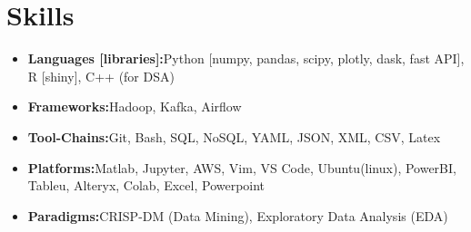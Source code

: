 \documentclass[a4paper,11pt]{article}
\newcommand{\resumeItem}[2]{
  \item{
    \textbf{#1}{\hspace{0.5mm}#2 \vspace{-0.5mm}}
  }
}
\newcommand{\resumeSubItem}[2]{\resumeItem{#1}{#2}\vspace{-4pt}}
\newcommand{\resumeHeadingSkillStart}{\begin{itemize}[leftmargin=*,itemsep=1mm, rightmargin=2ex]}
\newcommand{\resumeHeadingSkillEnd}{\end{itemize}\vspace{-2mm}}
\begin{document}
\begin{comment} %
\section{\textbf{Patents and Publications} \hfill \textcolor{darkblue}{\scriptsize C=Conference, J=Journal, P=Patent, S=In Submission, T=Thesis}}
\vspace{0.2mm}
\small{
\begin{enumerate}[leftmargin=*, labelsep=0.5em, align=left, widest={[\textbf{S.1}]}, itemindent=0em, label={\textbf{[\arabic*]}]}]
\item[\textbf{[C.1]}] Your Name, et al. (Year). \href{https://doi.org/XX.XXXX/XXXXXXX.XXXX.XXXXXXX}{\textbf{Title of Conference Paper}}. In \textit{Name of Conference Proceedings}, pp. XX-XX. Publisher. Date, Location. DOI: XX.XXXX/XXXXXXX.XXXX.XXXXXXX

\item[\textbf{[S.1]}] Your Name, et al. (Year). \textbf{Title of Submitted Paper}. Manuscript submitted for publication in \textit{Journal Name}.

\item[\textbf{[P.1]}] Inventor 1, Your Name, Inventor 3, et al. (Year). \href{https://patentoffice.gov/patent/XXXXXXXXX}{\textbf{Title of Patent}}. Patent Office, Patent No. XXXXXXXXX. Registration Date: Date, Grant Date: Date, Publication Date: Date.

\item[\textbf{[J.1]}] Author 1, Your Name, Author 3, et al. (Year). \href{https://doi.org/XX.XXXX/XXXXX.XXXX.XXXXXXX}{\textbf{Title of Journal Article}}. \textit{Journal Name}, Vol. XX, Issue X, pp. XXX-XXX. DOI: XX.XXXX/XXXXX.XXXX.XXXXXXX
\end{enumerate}
}
\end{comment} %

\section{\textbf{Skills}}
\vspace{-0.4mm}
 \resumeHeadingSkillStart
  \resumeSubItem{Languages {\tiny[libraries]}:}
    {Python {\tiny[numpy, pandas, scipy, plotly, dask, fast API]}, R {\tiny[shiny]}, C++ \scriptsize{(for DSA)}}
\resumeSubItem{Frameworks:}
    {Hadoop, Kafka, Airflow}
  \resumeSubItem{Tool-Chains:}
    {Git, Bash, SQL, NoSQL, YAML, JSON, XML, CSV, Latex}
  \resumeSubItem{Platforms:}
    {Matlab, Jupyter, AWS, Vim, VS Code, Ubuntu(linux), PowerBI, Tableu, Alteryx, Colab, Excel, Powerpoint}
  \resumeSubItem{Paradigms:}{CRISP-DM (Data Mining), Exploratory Data Analysis (EDA)}
 \resumeHeadingSkillEnd
\end{document}
